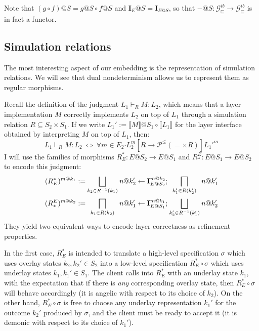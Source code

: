 \documentclass[11pt,oneside]{book}
\theoremstyle{definition}
\newcommand{\gcat}{\mathcal{G}_{\sqsubseteq}}
\newcommand{\bdot}{\boldsymbol{\cdot}}
\begin{document}
Note that
$(g \circ f)@S = g@S \circ f@S$ and
$\mathbf{I}_E@S = \mathbf{I}_{E@S}$,
so that $-@S : \gcat^{ib} \rightarrow \gcat^{ib}$
is in fact a functor.


\subsection{Simulation relations} %

The most interesting aspect of our embedding
is the representation of simulation relations.
We will see that dual nondeterminism
allows us to represent them as regular morphisms.

Recall the definition of
the judgment $L_1 \vdash_R M : L_2$,
which means that a layer implementation $M$
correctly implements $L_2$ on top of $L_1$
through a simulation relation $R \subseteq S_2 \times S_1$.
If we write
$L_1' := \llbracket M \rrbracket @ S_1 \circ \llbracket L_1 \rrbracket$
for the layer interface obtained
by interpreting $M$ on top of $L_1$,
then:
\[
  L_1 \vdash_R M : L_2 \:\Leftrightarrow\:
  \forall m \in E_2 \bdot
    L_2^m
    \mathrel{[R \rightarrow \mathcal{P}^\le({=} \times R)]}
    {L_1'}^m
\]
I will use the families of morphisms
$R^*_E : E@S_2 \rightarrow E@S_1$ and
$R_*^E : E@S_1 \rightarrow E@S_2$
to encode this judgment:
\[
  {\everymath={\displaystyle}
  \begin{array}{r@{\:}c@{\:}c@{\:}c@{\:}l}
  (R^*_E)^{m@k_1} := &
    \bigsqcup_{k_2 \in R^{-1}(k_1)} &
    n@k_2' \leftarrow \mathbf{I}^{m@k_2}_{E@S_2} ; &
    \bigsqcap_{k_1' \in R(k_2')} &
    n@k_1' \\[4ex]
  (R_*^E)^{m@k_2} := &
    \bigsqcap_{k_1 \in R(k_2)} &
    n@k_1' \leftarrow \mathbf{I}^{m@k_1}_{E@S_1} ; &
    \bigsqcup_{k_2' \in R^{-1}(k_1')} &
    n@k_2'
  \end{array}}
\]
They yield two equivalent ways to encode
layer correctness as refinement properties.

In the first case,
$R^*_E$ is intended to translate
a high-level specification $\sigma$
which uses overlay states $k_2, k_2' \in S_2$
into a low-level specification $R^*_E \circ \sigma$
which uses underlay states
$k_1, k_1' \in S_1$.
The client calls into $R^*_E$
with an underlay state $k_1$,
with the expectation that if there is \emph{any}
corresponding overlay state,
then $R^*_E \circ \sigma$ will behave accordingly
(it is angelic with respect to its choice of $k_2$).
On the other hand,
$R^*_E \circ \sigma$ is free to choose any underlay representation
$k_1'$
for the outcome $k_2'$ produced by $\sigma$,
and the client must be ready to accept it
(it is demonic with respect to its choice of $k_1'$).
\end{document}
